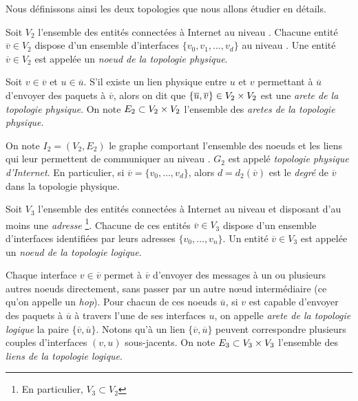 Nous définissons ainsi les deux topologies que nous allons étudier en détails.

\begin{definition}
\label{def:topologie-physique}
Soit $V_2$ l'ensemble des entités connectées à Internet au niveau \LL. Chacune
entité ${\overline v} \in V_2$ dispose d'un ensemble d'interfaces $\{v_0, v_1,
\ldots, v_d\}$ au niveau \LL. Une entité ${\overline v} \in V_2$ est appelée un
{\em noeud de la topologie physique}.
\end{definition}

\begin{definition}
\label{def:arete-topologie-physique}
Soit $v \in \overline{v}$ et $u \in \overline{u}$.
S'il existe un lien physique entre $u$ et $v$ permettant à $\overline{u}$
d'envoyer des paquets \ip à $\overline{v}$, alors on dit que $\{\overline{u},
\overline{v}\} \in V_2 \times V_2$ est une {\em arete de la topologie physique}. On
note $E_2 \subset V_2 \times V_2$ l'ensemble des {\em aretes de la topologie
physique}.
\end{definition}

\begin{definition}
\label{def:degre-topologie-physique}
On note $I_2 = (V_2, E_2)$ le graphe comportant l'ensemble des noeuds \LL et les
liens qui leur permettent de communiquer au niveau \LL. $G_2$ est appelé {\em
topologie physique d'Internet}. En particulier, si ${\overline v} = \{v_0,
\ldots, v_d\}$, alors $d = d_2(\overline{v})$ est le {\em degré} de ${\overline
v}$ dans la topologie physique.
\end{definition}

\begin{definition}
\label{def:noeud-topologie-logique}
Soit $V_3$ l'ensemble des entités connectées à Internet au niveau \LLL et
disposant d'au moins une {\em adresse \ip}\footnote{En particulier, $V_3
\subset V_2$}.
Chacune de ces entités ${\overline v} \in V_3$ dispose d'un ensemble d'interfaces identifiées par leurs adresses
\ip $\{v_0, \ldots, v_n\}$. Un entité ${\overline v} \in V_3$ est appelée un
{\em noeud de la topologie logique}.
\end{definition}

\begin{definition}
\label{def:arete-topologie-logique}
Chaque interface $v \in {\overline v}$ permet à ${\overline v}$ d'envoyer des
messages à un ou plusieurs autres noeuds \LLL directement, sans passer par un
autre n\oe{}ud intermédiaire (ce qu'on appelle un {\em hop}).
Pour chacun de ces noeuds ${\overline u}$, si $v$ est capable d'envoyer des
paquets \ip à ${\overline u}$ à travers l'une de ses interfaces $u$, on appelle
{\em arete de la topologie logique} la paire $\{{\overline v}, {\overline u}\}$.
Notons qu'à un lien $\{{\overline v}, {\overline u}\}$ peuvent correspondre
plusieurs couples d'interfaces $(v, u)$ sous-jacents. On note $E_3 \subset
V_3 \times V_3$ l'ensemble des {\em liens de la topologie logique}.
\end{definition}

